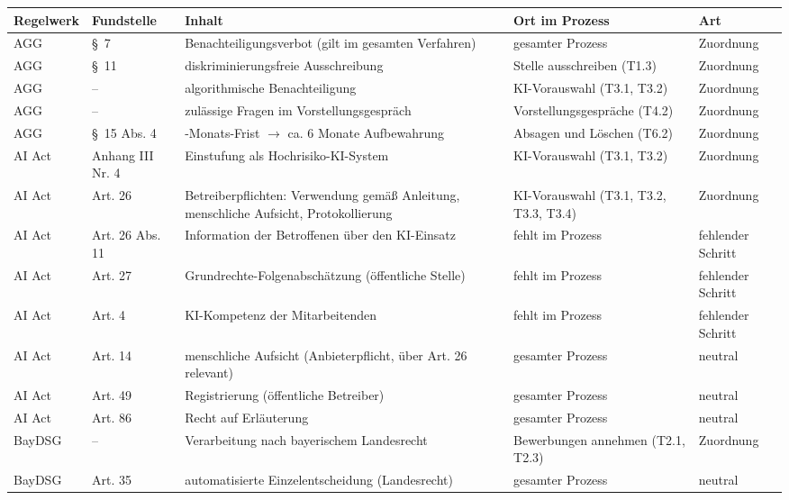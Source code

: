 \begin{small}
\begin{longtable}{@{}>{\raggedright\arraybackslash}p{1.9cm}>{\raggedright\arraybackslash}p{2.0cm}>{\raggedright\arraybackslash}p{5.0cm}>{\raggedright\arraybackslash}p{4.0cm}>{\raggedright\arraybackslash}p{1.8cm}@{}}
\toprule \textbf{Regelwerk} & \textbf{Fundstelle} & \textbf{Inhalt} & \textbf{Ort im Prozess} & \textbf{Art} \\ \midrule \endhead
\bottomrule \endfoot
AGG & §~7 & Benachteiligungsverbot (gilt im gesamten Verfahren) & gesamter Prozess & Zuordnung \\
AGG & §~11 & diskriminierungsfreie Ausschreibung & Stelle ausschreiben (T1.3) & Zuordnung \\
AGG & -- & algorithmische Benachteiligung & KI-Vorauswahl (T3.1, T3.2) & Zuordnung \\
AGG & -- & zulässige Fragen im Vorstellungsgespräch & Vorstellungsgespräche (T4.2) & Zuordnung \\
AGG & §~15 Abs. 4 & 2-Monats-Frist $\rightarrow$ ca. 6 Monate Aufbewahrung & Absagen und Löschen (T6.2) & Zuordnung \\
AI Act & Anhang III Nr. 4 & Einstufung als Hochrisiko-KI-System & KI-Vorauswahl (T3.1, T3.2) & Zuordnung \\
AI Act & Art. 26 & Betreiberpflichten: Verwendung gemäß Anleitung, menschliche Aufsicht, Protokollierung & KI-Vorauswahl (T3.1, T3.2, T3.3, T3.4) & Zuordnung \\
AI Act & Art. 26 Abs. 11 & Information der Betroffenen über den KI-Einsatz & fehlt im Prozess & fehlender Schritt \\
AI Act & Art. 27 & Grundrechte-Folgenabschätzung (öffentliche Stelle) & fehlt im Prozess & fehlender Schritt \\
AI Act & Art. 4 & KI-Kompetenz der Mitarbeitenden & fehlt im Prozess & fehlender Schritt \\
AI Act & Art. 14 & menschliche Aufsicht (Anbieterpflicht, über Art. 26 relevant) & gesamter Prozess & neutral \\
AI Act & Art. 49 & Registrierung (öffentliche Betreiber) & gesamter Prozess & neutral \\
AI Act & Art. 86 & Recht auf Erläuterung & gesamter Prozess & neutral \\
BayDSG & -- & Verarbeitung nach bayerischem Landesrecht & Bewerbungen annehmen (T2.1, T2.3) & Zuordnung \\
BayDSG & Art. 35 & automatisierte Einzelentscheidung (Landesrecht) & gesamter Prozess & neutral \\

\end{longtable}
\end{small}
